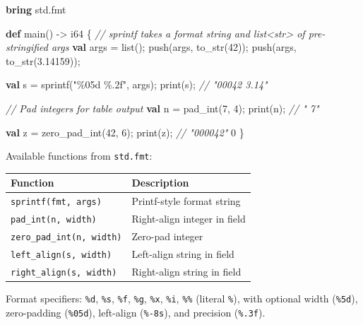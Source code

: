 \documentclass[
  english,
]{book}
\newenvironment{Shaded}{\begin{snugshade}}{\end{snugshade}}
\newcommand{\CommentTok}[1]{\textcolor[rgb]{0.42,0.60,0.33}{\textit{#1}}}
\newcommand{\DataTypeTok}[1]{\textcolor[rgb]{0.31,0.79,0.69}{#1}}
\newcommand{\DecValTok}[1]{\textcolor[rgb]{0.71,0.81,0.66}{#1}}
\newcommand{\FloatTok}[1]{\textcolor[rgb]{0.71,0.81,0.66}{#1}}
\newcommand{\FunctionTok}[1]{\textcolor[rgb]{0.86,0.86,0.67}{#1}}
\newcommand{\KeywordTok}[1]{\textcolor[rgb]{0.34,0.61,0.84}{\textbf{#1}}}
\newcommand{\NormalTok}[1]{\textcolor[rgb]{0.83,0.83,0.83}{#1}}
\newcommand{\OperatorTok}[1]{\textcolor[rgb]{0.83,0.83,0.83}{#1}}
\newcommand{\StringTok}[1]{\textcolor[rgb]{0.81,0.57,0.47}{#1}}
\begin{document}
\begin{Shaded}
\begin{Highlighting}[]
\KeywordTok{bring}\NormalTok{ std}\OperatorTok{.}\NormalTok{fmt}

\KeywordTok{def}\NormalTok{ main() }\OperatorTok{{-}\textgreater{}} \DataTypeTok{i64}\NormalTok{ \{}
    \CommentTok{// sprintf takes a format string and list\textless{}str\textgreater{} of pre{-}stringified args}
    \KeywordTok{val}\NormalTok{ args }\OperatorTok{=} \DataTypeTok{list}\NormalTok{();}
    \FunctionTok{push}\NormalTok{(args, }\FunctionTok{to\_str}\NormalTok{(}\DecValTok{42}\NormalTok{));}
    \FunctionTok{push}\NormalTok{(args, }\FunctionTok{to\_str}\NormalTok{(}\FloatTok{3.14159}\NormalTok{));}

    \KeywordTok{val}\NormalTok{ s }\OperatorTok{=}\NormalTok{ sprintf(}\StringTok{"\%05d \%.2f"}\NormalTok{, args);}
    \FunctionTok{print}\NormalTok{(s);   }\CommentTok{// "00042 3.14"}

    \CommentTok{// Pad integers for table output}
    \KeywordTok{val}\NormalTok{ n }\OperatorTok{=}\NormalTok{ pad\_int(}\DecValTok{7}\NormalTok{, }\DecValTok{4}\NormalTok{);}
    \FunctionTok{print}\NormalTok{(n);   }\CommentTok{// "   7"}

    \KeywordTok{val}\NormalTok{ z }\OperatorTok{=}\NormalTok{ zero\_pad\_int(}\DecValTok{42}\NormalTok{, }\DecValTok{6}\NormalTok{);}
    \FunctionTok{print}\NormalTok{(z);   }\CommentTok{// "000042"}
    \DecValTok{0}
\NormalTok{\}}
\end{Highlighting}
\end{Shaded}

Available functions from \texttt{std.fmt}:

\begin{longtable}[]{@{}ll@{}}
\toprule\noalign{}
Function & Description \\
\midrule\noalign{}
\endhead
\bottomrule\noalign{}
\endlastfoot
\texttt{sprintf(fmt,\ args)} & Printf-style format string \\
\texttt{pad\_int(n,\ width)} & Right-align integer in field \\
\texttt{zero\_pad\_int(n,\ width)} & Zero-pad integer \\
\texttt{left\_align(s,\ width)} & Left-align string in field \\
\texttt{right\_align(s,\ width)} & Right-align string in field \\
\end{longtable}

Format specifiers: \texttt{\%d}, \texttt{\%s}, \texttt{\%f},
\texttt{\%g}, \texttt{\%x}, \texttt{\%i}, \texttt{\%\%} (literal
\texttt{\%}), with optional width (\texttt{\%5d}), zero-padding
(\texttt{\%05d}), left-align (\texttt{\%-8s}), and precision
(\texttt{\%.3f}).
\end{document}
